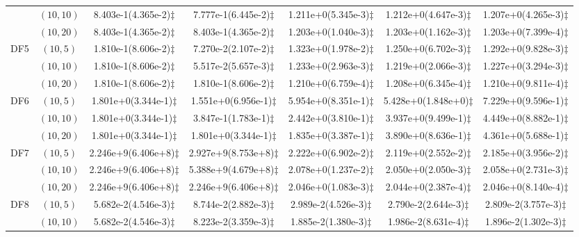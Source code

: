 \documentclass[review]{elsarticle}
\begin{document}
\begin{table*}[!htb]
{\begin{tabular}{ccccccc}
&$(10,10)$ &8.403e-1(4.365e-2)$\ddagger$ &7.777e-1(6.445e-2)$\ddagger$ &1.211e+0(5.345e-3)$\ddagger$ &1.212e+0(4.647e-3)$\ddagger$ &1.207e+0(4.265e-3)$\ddagger$ \\
&$(10,20)$ &8.403e-1(4.365e-2)$\ddagger$ &8.403e-1(4.365e-2)$\ddagger$ &1.203e+0(1.040e-3)$\ddagger$ &1.203e+0(1.162e-3)$\ddagger$ &1.203e+0(7.399e-4)$\ddagger$ \\
\hline  \multirow{3}{*}{DF5}
&$(10,5)$ &1.810e-1(8.606e-2)$\ddagger$ &7.270e-2(2.107e-2)$\ddagger$ &1.323e+0(1.978e-2)$\ddagger$ &1.250e+0(6.702e-3)$\ddagger$ &1.292e+0(9.828e-3)$\ddagger$ \\
&$(10,10)$ &1.810e-1(8.606e-2)$\ddagger$ &5.517e-2(5.657e-3)$\ddagger$ &1.233e+0(2.963e-3)$\ddagger$ &1.219e+0(2.066e-3)$\ddagger$ &1.227e+0(3.294e-3)$\ddagger$ \\
&$(10,20)$ &1.810e-1(8.606e-2)$\ddagger$ &1.810e-1(8.606e-2)$\ddagger$ &1.210e+0(6.759e-4)$\ddagger$ &1.208e+0(6.345e-4)$\ddagger$ &1.210e+0(9.811e-4)$\ddagger$ \\
\hline  \multirow{3}{*}{DF6}
&$(10,5)$ &1.801e+0(3.344e-1)$\ddagger$ &1.551e+0(6.956e-1)$\ddagger$ &5.954e+0(8.351e-1)$\ddagger$ &5.428e+0(1.848e+0)$\ddagger$ &7.229e+0(9.596e-1)$\ddagger$ \\
&$(10,10)$ &1.801e+0(3.344e-1)$\ddagger$ &3.847e-1(1.783e-1)$\ddagger$ &2.442e+0(3.810e-1)$\ddagger$ &3.937e+0(9.499e-1)$\ddagger$ &4.449e+0(8.882e-1)$\ddagger$ \\
&$(10,20)$ &1.801e+0(3.344e-1)$\ddagger$ &1.801e+0(3.344e-1)$\ddagger$ &1.835e+0(3.387e-1)$\ddagger$ &3.890e+0(8.636e-1)$\ddagger$ &4.361e+0(5.688e-1)$\ddagger$ \\
\hline  \multirow{3}{*}{DF7}
&$(10,5)$ &2.246e+9(6.406e+8)$\ddagger$ &2.927e+9(8.753e+8)$\ddagger$ &2.222e+0(6.902e-2)$\ddagger$ &2.119e+0(2.552e-2)$\ddagger$ &2.185e+0(3.956e-2)$\ddagger$ \\
&$(10,10)$ &2.246e+9(6.406e+8)$\ddagger$ &5.388e+9(4.679e+8)$\ddagger$ &2.078e+0(1.237e-2)$\ddagger$ &2.050e+0(2.050e-3)$\ddagger$ &2.058e+0(2.731e-3)$\ddagger$ \\
&$(10,20)$ &2.246e+9(6.406e+8)$\ddagger$ &2.246e+9(6.406e+8)$\ddagger$ &2.046e+0(1.083e-3)$\ddagger$ &2.044e+0(2.387e-4)$\ddagger$ &2.046e+0(8.140e-4)$\ddagger$ \\
\hline  \multirow{3}{*}{DF8}
&$(10,5)$ &5.682e-2(4.546e-3)$\ddagger$ &8.744e-2(2.882e-3)$\ddagger$ &2.989e-2(4.526e-3)$\ddagger$ &2.790e-2(2.644e-3)$\ddagger$ &2.809e-2(3.757e-3)$\ddagger$ \\
&$(10,10)$ &5.682e-2(4.546e-3)$\ddagger$ &8.223e-2(3.359e-3)$\ddagger$ &1.885e-2(1.380e-3)$\ddagger$ &1.986e-2(8.631e-4)$\ddagger$ &1.896e-2(1.302e-3)$\ddagger$ \\

\end{tabular}}
\end{table*}
\end{document}
